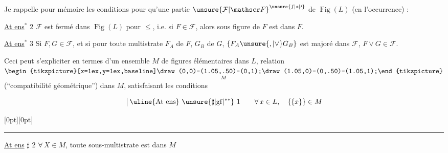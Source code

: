 
Je rappelle pour mémoire les conditions   pour qu'une partie ${\unsure{\mathcal F|\mathscr F}}^{\unsure{f|*|\prime}}$ de $\operatorname{Fig}(L)$ (en l'occurrence) :

\uline{At ens$^{*}$} 2 \quad $\mathcal F$ est fermé dans $\operatorname{Fig}(L)$ pour $\leq$, i.e. si $F\in\mathcal F$, alors  sous figure de $F$ est dans $F$.

\uline{At ens$^{*}$} 3 \quad Si $F,G\in\mathcal F$, et si pour  toute multistrate $F_A$ de $F$, $G_B$ de $G$, $\{F_A\unsure{,|\vee}G_B\}$ est majoré dans $\mathcal F$,     $F\vee G\in\mathcal F$.

Ceci peut s'expliciter   en termes d'un ensemble $M$ de figures  élémentaires dans $L$,   relation $\underset{M}{\mathrel{\vcenter{\hbox{\begin{tikzpicture}[x=1ex,y=1ex,baseline]\draw (0,0)--(1.05,.50)--(0,1);\draw (1.05,0)--(0,.50)--(1.05,1);\end{tikzpicture}}}}}$ (``compatibilité géométrique'')  dans $M$, satisfaisant les conditions

\[
\big|\,\text{\uline{At ens}}\ \unsure{\sharp|\mathrm{gf}|{}^{**}}\ 1\qquad\forall\,x\in L,\quad\{\{x\}\}\in M
\]

\noindent\raisebox{0pt}[0pt][0pt]{\rule[-1.5\baselineskip]{.35pt}{2.4\baselineskip}}\quad
\uline{At ens} $\sharp$ 2 \quad {} $\forall\,X\in M$, toute sous-multistrate est dans $M$

